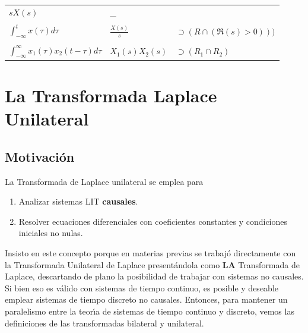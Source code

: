 \begin{center}
\begin{tabular}{lll}
     $sX\left(s\right) $            & 
 \_                                                                                                      \\
                         &                                               &                               \\
 $\int_{-\infty }^{t}x\left( \tau \right) d\tau $ & 
     $\frac{X\left( s\right) }{s}$  & 
        $\supset (R\cap (\Re(s) >0)))$ \\ 
                        &                                               &                       \\
 $\int_{-\infty }^{\infty }x_{1}\left( \tau \right)x_{2}\left( t-\tau \right) d\tau $  & 
                $X_{1}\left( s\right) X_{2}\left(s\right) $ & $\supset (R_{1}\cap R_{2}) $
\end{tabular}
\end{center}

% 



\section{La Transformada Laplace Unilateral}

\subsection{Motivaci\'{o}n}

La Transformada de Laplace unilateral se emplea para 
\begin{enumerate}
   \item   Analizar sistemas LIT \textbf{causales}.
   \item   Resolver ecuaciones diferenciales con coeficientes constantes y condiciones iniciales no  nulas.
\end{enumerate}
Insisto en este concepto porque en materias previas se trabaj\'{o} directamente con la Transformada 
Unilateral de Laplace present\'{a}ndola como \textbf{LA} Transformada de Laplace, descartando de plano la 
posibilidad de trabajar con sistemas no causales. Si bien eso es v\'{a}lido con sistemas de tiempo 
continuo, es posible y deseable emplear sistemas de tiempo discreto no causales. Entonces, para mantener
un paralelismo entre la teor\'{\i}a de sistemas de tiempo continuo y discreto, vemos las definiciones
de las transformadas bilateral y unilateral.

